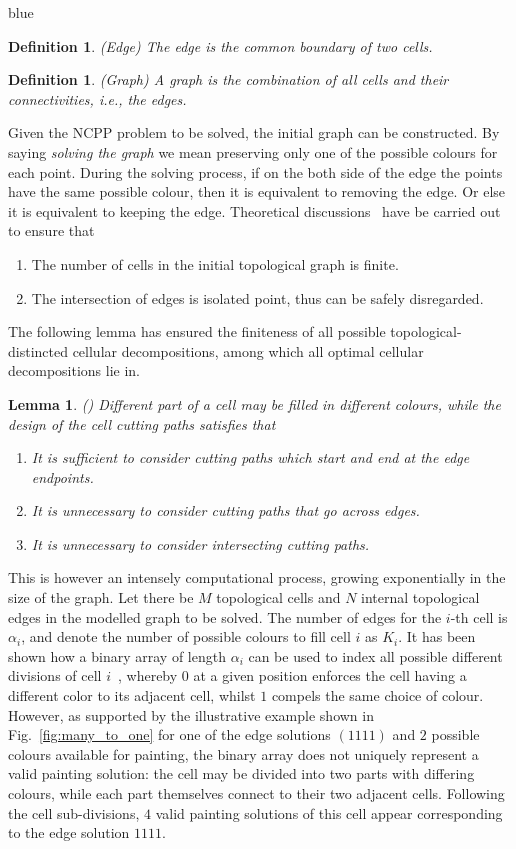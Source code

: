 \documentclass[journal]{IEEEtran}
\newtheorem{definition}[theorem]{Definition}
\newtheorem{lemma}[theorem]{Lemma}
\begin{document}
\begin{color}{blue}
\begin{definition}
(Edge) The edge is the common boundary of two cells.  
\end{definition}
\begin{definition}
(Graph) A graph is the combination of all cells and their connectivities, i.e., the edges. 
\end{definition}
Given the NCPP problem to be solved, the initial graph can be constructed. 
By saying \textit{solving the graph} we mean preserving only one of the possible colours for each point. 
During the solving process, if on the both side of the edge the points have the same possible colour, then it is equivalent to removing the edge. Or else it is equivalent to keeping the edge. 
Theoretical discussions~\cite{Yang2020Cellular} have be carried out to ensure that 
\begin{enumerate}
\item The number of cells in the initial topological graph is finite. 
\item The intersection of edges is isolated point, thus can be safely disregarded. 
\end{enumerate}
The following lemma has ensured the finiteness of all possible topological-distincted cellular decompositions, among which all optimal cellular decompositions lie in. 
\begin{lemma}\label{lemma:tmech_equiv}
(\cite{Yang2020Cellular}) Different part of a cell may be filled in different colours, while the design of the cell cutting paths satisfies that 
\begin{enumerate}
\item It is sufficient to consider cutting paths which start and end at the edge endpoints. 
\item It is unnecessary to consider cutting paths that go across edges.
\item It is unnecessary to consider intersecting cutting paths. 
\end{enumerate}
\end{lemma}
\end{color}

This is however an intensely computational process, growing exponentially in the size of the graph. Let there be $M$ topological cells and $N$ internal topological edges in the modelled graph to be solved. The number of edges for the $i$-th cell is $\alpha_i$, and denote the number of possible colours to fill cell $i$ as $K_i$.   
It has been shown how a binary array of length $\alpha_i$ can be used to index all possible different divisions of cell $i$~\cite{Yang2020Cellular}, whereby $0$ at a given position enforces the cell having a different color to its adjacent cell, whilst $1$ compels the same choice of colour. 
However, as supported by the illustrative example shown in Fig.~\ref{fig:many_to_one} for one of the edge solutions $(1111)$ and $2$ possible colours available for painting, the binary array does not uniquely represent a valid painting solution: the cell may be divided into two parts with differing colours, while each part themselves connect to their two adjacent cells. Following the cell sub-divisions, $4$ valid painting solutions of this cell appear corresponding to the edge solution $1111$. 
\end{document}
